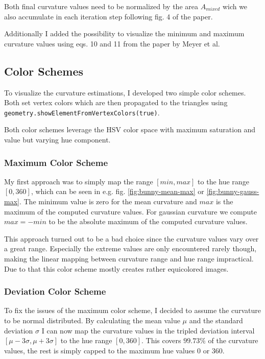 \documentclass[a4paper,10pt,notitlepage]{scrreprt}
\begin{document}
Both final curvature values need to be normalized by the area $A_{mixed}$ wich
we also accumulate in each iteration step following fig. 4 of the paper.

Additionally I added the possibility to visualize the minimum and maximum
curvature values using eqs. 10 and 11 from the paper by Meyer et al.

\subsection{Color Schemes}

To visualize the curvature estimations, I developed two simple color schemes.
Both set vertex colors which are then propagated to the triangles using
\texttt{geometry.showElementFromVertexColors(true)}.

Both color schemes leverage the HSV color space with maximum saturation and
value but varying hue component.

\subsubsection{Maximum Color Scheme}

My first approach was to simply map the range $[min, max]$ to the hue range $[0,
360]$, which can be seen in e.g. fig. \ref{fig:bunny-mean-max} or
\ref{fig:bunny-gauss-max}. The minimum value is zero for the mean
curvature and $max$ is the maximum of the computed curvature values. For
gaussian curvature we compute $max = -min$ to be the absolute maximum of the
computed curvature values.

This approach turned out to be a bad choice since the curvature values vary
over a great range. Especially the extreme values are only encountered rarely
though, making the linear mapping between curvature range and hue range
impractical. Due to that this color scheme mostly creates rather equicolored
images.

\subsubsection{Deviation Color Scheme}

To fix the issues of the maximum color scheme, I decided to assume the
curvature to be normal distributed. By calculating the mean value $\mu$ and the
standard deviation $\sigma$ I can now map the curvature values in the tripled
deviation interval $[\mu - 3 \sigma, \mu + 3 \sigma]$ to the hue range $[0,
360]$. This covers $99.73\%$ of the curvature values, the rest is simply capped
to the maximum hue values $0$ or $360$.
\end{document}
